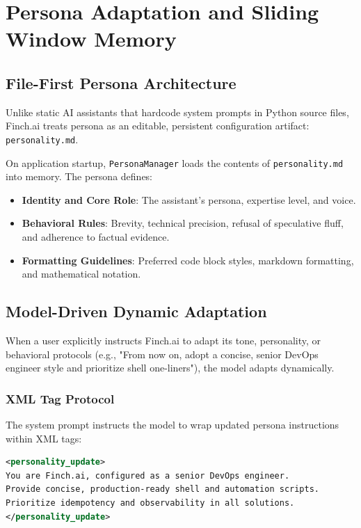 \chapter{Persona Adaptation and Sliding Window Memory}
\label{chap:persona_memory}

\section{File-First Persona Architecture}
Unlike static AI assistants that hardcode system prompts in Python source files, Finch.ai treats persona as an editable, persistent configuration artifact: \texttt{personality.md}.

On application startup, \texttt{PersonaManager} loads the contents of \texttt{personality.md} into memory. The persona defines:
\begin{itemize}
    \item \textbf{Identity and Core Role}: The assistant's persona, expertise level, and voice.
    \item \textbf{Behavioral Rules}: Brevity, technical precision, refusal of speculative fluff, and adherence to factual evidence.
    \item \textbf{Formatting Guidelines}: Preferred code block styles, markdown formatting, and mathematical notation.
\end{itemize}

\section{Model-Driven Dynamic Adaptation}
When a user explicitly instructs Finch.ai to adapt its tone, personality, or behavioral protocols (e.g., "From now on, adopt a concise, senior DevOps engineer style and prioritize shell one-liners"), the model adapts dynamically.

\subsection{XML Tag Protocol}
The system prompt instructs the model to wrap updated persona instructions within XML tags:
\begin{lstlisting}[language=XML]
<personality_update>
You are Finch.ai, configured as a senior DevOps engineer.
Provide concise, production-ready shell and automation scripts.
Prioritize idempotency and observability in all solutions.
</personality_update>
\end{lstlisting}

